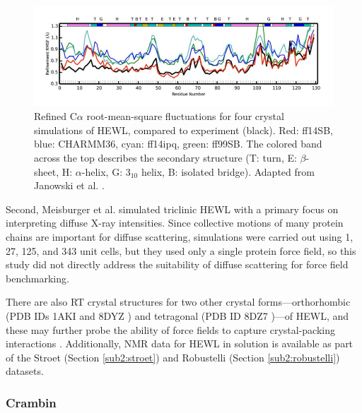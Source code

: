 \documentclass[9pt,review,pubversion]{livecoms}
\begin{document}
\begin{figure}
    \centering
    \includegraphics[width=\linewidth]{janowski-2016-fig-4c.pdf}
    \caption{Refined C$\alpha$ root-mean-square fluctuations for four crystal simulations of HEWL, compared to experiment (black).
    Red: ff14SB, blue: CHARMM36, cyan: ff14ipq, green: ff99SB. 
    The colored band across the top describes the secondary structure (T: turn, E: $\beta$-sheet, H: $\alpha$-helix, G: $3_{10}$ helix, B: isolated bridge).
    Adapted from Janowski et al. \cite{janowski_molecular_2016}.}
    \label{fig:hewl_xtal_rmsf}
\end{figure}

Second, Meisburger et al. \cite{meisburger_diffuse_2020} simulated triclinic HEWL with a primary focus on interpreting diffuse X-ray intensities.
Since collective motions of many protein chains are important for diffuse scattering, simulations were carried out using 1, 27, 125, and 343 unit cells, but they used only a single protein force field, so this study did not directly address the suitability of diffuse scattering for force field benchmarking.

There are also RT crystal structures for two other crystal forms---orthorhombic (PDB IDs 1AKI \cite{artymiuk_structures_1982} and 8DYZ \cite{meisburger_robust_2023}) and tetragonal (PDB ID 8DZ7 \cite{meisburger_robust_2023})---of HEWL, and these may further probe the ability of force fields to capture crystal-packing interactions \cite{meisburger_robust_2023}.
Additionally, NMR data for HEWL in solution is available as part of the Stroet (Section \ref{sub2:stroet}) and Robustelli (Section \ref{sub2:robustelli}) datasets.

\subsubsection{Crambin}
\label{sub2:crambin}
\end{document}
